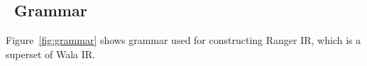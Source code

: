 %

\subsection{\tool\ Grammar}
Figure~\ref{fig:grammar} shows grammar used for constructing Ranger IR, which is a superset of Wala IR.

